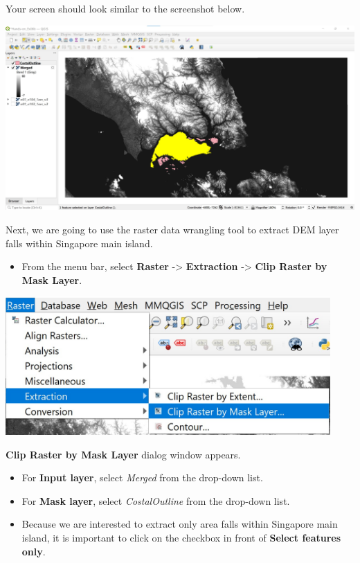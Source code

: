 \documentclass[
  letterpaper,
  DIV=11,
  numbers=noendperiod]{scrreprt}
\providecommand{\tightlist}{%
  \setlength{\itemsep}{0pt}\setlength{\parskip}{0pt}}\usepackage{longtable,booktabs,array}
\begin{document}
Your screen should look similar to the screenshot below.

\includegraphics{./img06/image49.jpg}

Next, we are going to use the raster data wrangling tool to extract DEM
layer falls within Singapore main island.

\begin{itemize}
\tightlist
\item
  From the menu bar, select \textbf{Raster} -\textgreater{}
  \textbf{Extraction} -\textgreater{} \textbf{Clip Raster by Mask
  Layer}.
\end{itemize}

\includegraphics[width=4.88542in,height=\textheight]{./img06/image50.jpg}

\textbf{Clip Raster by Mask Layer} dialog window appears.

\begin{itemize}
\item
  For \textbf{Input layer}, select \emph{Merged} from the drop-down
  list.
\item
  For \textbf{Mask layer}, select \emph{CostalOutline} from the
  drop-down list.
\item
  Because we are interested to extract only area falls within Singapore
  main island, it is important to click on the checkbox in front of
  \textbf{Select features only}.
\end{itemize}
\end{document}
